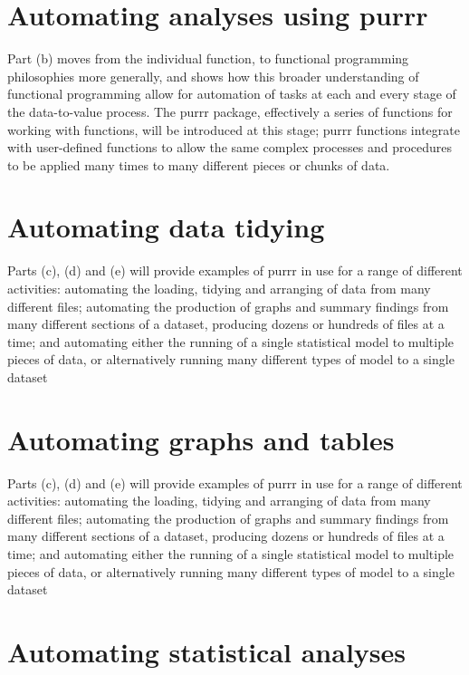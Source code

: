 \documentclass[]{book}
\theoremstyle{definition}
\theoremstyle{definition}
\theoremstyle{definition}
\theoremstyle{remark}
\begin{document}
\section{Automating analyses using
purrr}\label{automating-analyses-using-purrr}

Part (b) moves from the individual function, to functional programming
philosophies more generally, and shows how this broader understanding of
functional programming allow for automation of tasks at each and every
stage of the data-to-value process. The purrr package, effectively a
series of functions for working with functions, will be introduced at
this stage; purrr functions integrate with user-defined functions to
allow the same complex processes and procedures to be applied many times
to many different pieces or chunks of data.

\section{Automating data tidying}\label{automating-data-tidying}

Parts (c), (d) and (e) will provide examples of purrr in use for a range
of different activities: automating the loading, tidying and arranging
of data from many different files; automating the production of graphs
and summary findings from many different sections of a dataset,
producing dozens or hundreds of files at a time; and automating either
the running of a single statistical model to multiple pieces of data, or
alternatively running many different types of model to a single dataset

\section{Automating graphs and
tables}\label{automating-graphs-and-tables}

Parts (c), (d) and (e) will provide examples of purrr in use for a range
of different activities: automating the loading, tidying and arranging
of data from many different files; automating the production of graphs
and summary findings from many different sections of a dataset,
producing dozens or hundreds of files at a time; and automating either
the running of a single statistical model to multiple pieces of data, or
alternatively running many different types of model to a single dataset

\section{Automating statistical
analyses}\label{automating-statistical-analyses}
\end{document}
